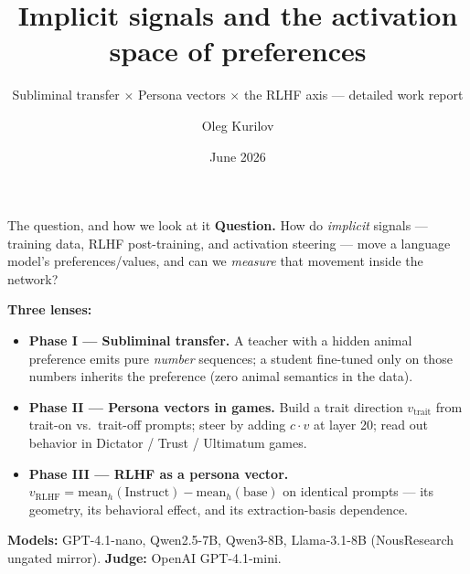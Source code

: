 \documentclass[aspectratio=169,11pt]{beamer}
\title[Implicit signals \& activation space]{Implicit signals and the activation space of preferences}
\subtitle{Subliminal transfer $\times$ Persona vectors $\times$ the RLHF axis --- detailed work report}
\author{Oleg Kurilov}
\date{June 2026}
\begin{document}
\begin{frame}
  \titlepage
\end{frame}


\begin{frame}{The question, and how we look at it}
  \textbf{Question.} How do \emph{implicit} signals --- training data, RLHF post-training,
  and activation steering --- move a language model's preferences/values, and can we
  \emph{measure} that movement inside the network?

  \vspace{0.6em}
  \textbf{Three lenses:}
  \begin{itemize}
    \item \textbf{Phase I --- Subliminal transfer.} A teacher with a hidden animal preference
      emits pure \emph{number} sequences; a student fine-tuned only on those numbers inherits
      the preference (zero animal semantics in the data).
    \item \textbf{Phase II --- Persona vectors in games.} Build a trait direction
      $v_\text{trait}$ from trait-on vs.\ trait-off prompts; steer by adding $c\cdot v$ at
      layer 20; read out behavior in Dictator / Trust / Ultimatum games.
    \item \textbf{Phase III --- RLHF as a persona vector.}
      $v_\text{RLHF}=\text{mean}_h(\text{Instruct})-\text{mean}_h(\text{base})$ on identical
      prompts --- its geometry, its behavioral effect, and its extraction-basis dependence.
  \end{itemize}

  \vspace{0.4em}
  \footnotesize\textbf{Models:} GPT-4.1-nano, Qwen2.5-7B, Qwen3-8B, Llama-3.1-8B (NousResearch
  ungated mirror). \quad \textbf{Judge:} OpenAI GPT-4.1-mini.
\end{frame}
\end{document}

